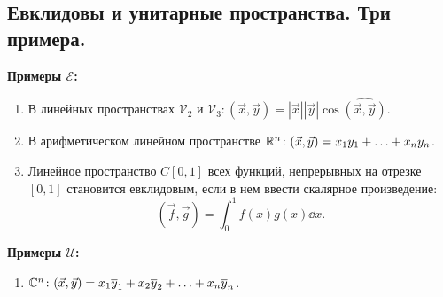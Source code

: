 \subsection{
    Евклидовы и унитарные пространства. Три примера.
}

\textbf{Примеры $\mathcal{E}$:}
\begin{enumerate}
    \item В линейных пространствах $\mathcal{V}_2$ и $\mathcal{V}_3 \colon (\vec{x}, \vec{y}) = |\vec{x}||\vec{y}|\cos \widehat{(\vec{x}, \vec{y})}$.
    \item В арифметическом линейном пространстве $\mathbb{R}^n \colon (\vec{x}, \vec{y}) = x_1y_1 + \ldots + x_ny_n$. 
    \item Линейное пространство $C[0, 1]$ всех функций, непрерывных на отрезке $[0, 1]$ становится евклидовым, если в нем ввести скалярное произведение:
    $$(\vec{f}, \vec{g}) = \int_{0}^{1} f(x)g(x) \dd x.$$
\end{enumerate}

\textbf{Примеры $\mathcal{U}$:}

\begin{enumerate}
    \item $\mathbb{C}^n \colon (\vec{x}, \vec{y}) = x_1\overline{y}_1 + x_2\overline{y}_2 + \ldots + x_n\overline{y}_n$.
\end{enumerate}
